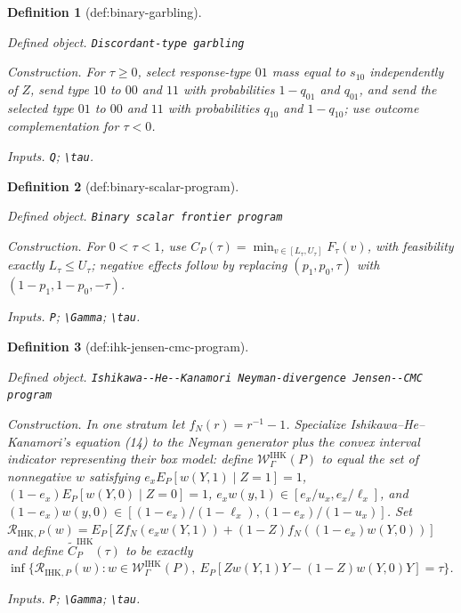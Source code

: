 \documentclass{article}
\newtheorem{definition}{Definition}
\begin{document}
\begin{definition}[def:binary-garbling]\label{def:binary-garbling}
\par\smallskip\noindent\emph{Defined object.} \texttt{Discordant-\allowbreak{}type garbling}
\par\smallskip\noindent\emph{Construction.} For \(\tau\geq0\), select response-type \(01\) mass equal to \(s_{10}\) independently of \(Z\), send type \(10\) to \(00\) and \(11\) with probabilities \(1-q_{01}\) and \(q_{01}\), and send the selected type \(01\) to \(00\) and \(11\) with probabilities \(q_{10}\) and \(1-q_{10}\); use outcome complementation for \(\tau<0\).
\par\smallskip\noindent\emph{Inputs.} \texttt{Q}; \texttt{\textbackslash{}\allowbreak{}tau}.
\end{definition}

\begin{definition}[def:binary-scalar-program]\label{def:binary-scalar-program}
\par\smallskip\noindent\emph{Defined object.} \texttt{Binary scalar frontier program}
\par\smallskip\noindent\emph{Construction.} For \(0<\tau<1\), use \(C_P(\tau)=\min_{v\in[L_\tau,U_\tau]}F_\tau(v)\), with feasibility exactly \(L_\tau\leq U_\tau\); negative effects follow by replacing \((p_1,p_0,\tau)\) with \((1-p_1,1-p_0,-\tau)\).
\par\smallskip\noindent\emph{Inputs.} \texttt{P}; \texttt{\textbackslash{}\allowbreak{}Gamma}; \texttt{\textbackslash{}\allowbreak{}tau}.
\end{definition}

\begin{definition}[def:ihk-jensen-cmc-program]\label{def:ihk-jensen-cmc-program}
\par\smallskip\noindent\emph{Defined object.} \texttt{Ishikawa-\allowbreak{}-\allowbreak{}He-\allowbreak{}-\allowbreak{}Kanamori Neyman-\allowbreak{}divergence Jensen-\allowbreak{}-\allowbreak{}CMC program}
\par\smallskip\noindent\emph{Construction.} In one stratum let \(f_N(r)=r^{-1}-1\). Specialize Ishikawa--He--Kanamori's equation (14) to the Neyman generator plus the convex interval indicator representing their box model: define \(\mathcal W^{\mathrm{IHK}}_{\Gamma}(P)\) to equal the set of nonnegative \(w\) satisfying \(e_xE_P[w(Y,1)\mid Z=1]=1\), \((1-e_x)E_P[w(Y,0)\mid Z=0]=1\), \(e_xw(y,1)\in[e_x/u_x,e_x/\ell_x]\), and \((1-e_x)w(y,0)\in[(1-e_x)/(1-\ell_x),(1-e_x)/(1-u_x)]\). Set \(\mathscr R_{\mathrm{IHK},P}(w)=E_P[Zf_N(e_xw(Y,1))+(1-Z)f_N((1-e_x)w(Y,0))]\) and define \(\widetilde C^{\mathrm{IHK}}_P(\tau)\) to be exactly \(\inf\{\mathscr R_{\mathrm{IHK},P}(w):w\in\mathcal W^{\mathrm{IHK}}_{\Gamma}(P),\ E_P[Zw(Y,1)Y-(1-Z)w(Y,0)Y]=\tau\}\).
\par\smallskip\noindent\emph{Inputs.} \texttt{P}; \texttt{\textbackslash{}\allowbreak{}Gamma}; \texttt{\textbackslash{}\allowbreak{}tau}.
\end{definition}
\end{document}
